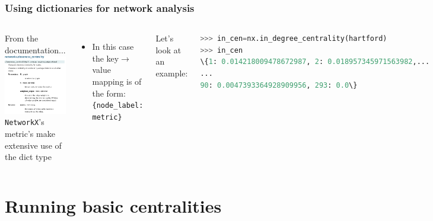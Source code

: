 \documentclass[xcolor=dvipsnames, 9pt]{beamer}
\begin{document}
\begin{frame}[fragile]
    \frametitle{Using dictionaries for network analysis}
    \begin{columns}
        From the documentation...\\ \vspace{3mm}
        \includegraphics[width=5cm]{../images/figures/closeness_doc.png}
        \texttt{NetworkX}'s metric's make extensive use of the dict type
        \begin{itemize}
            \item In this case the key$\rightarrow$value mapping is of the form: \texttt{\{node\_label: metric\}} 
        \end{itemize}
        Let's look at an example:
        \begin{block}{}
            \scriptsize{\begin{lstlisting}[language=Python]
>>> in_cen=nx.in_degree_centrality(hartford)
>>> in_cen
\{1: 0.014218009478672987, 2: 0.018957345971563982,...
...
90: 0.0047393364928909956, 293: 0.0\}
            \end{lstlisting}}
        \end{block}
        We can see that node \#90 has in-degree centrality 0.0047
        \begin{itemize}
            \item But we can do so much more!
        \end{itemize}
    \end{columns}
\end{frame}



\section{Running basic centralities} %
\label{sec:running_basic_centralities}
\end{document}
